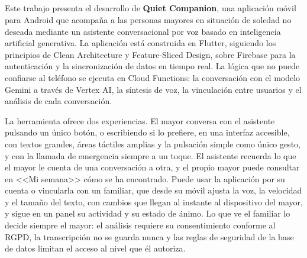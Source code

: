 \pagestyle{empty}

\chapter*{}

\thispagestyle{empty}

\begin{center}
{\large\bfseries \thetitle}\\
\end{center}
\begin{center}
\theauthor\\
\end{center}

\vspace{0.5cm}
\par\vspace{\baselineskip}

Este trabajo presenta el desarrollo de \textbf{Quiet Companion}, una aplicación móvil para Android que acompaña a las personas mayores en situación de soledad no deseada mediante un asistente conversacional por voz basado en inteligencia artificial generativa. La aplicación está construida en Flutter, siguiendo los principios de Clean Architecture y Feature-Sliced Design, sobre Firebase para la autenticación y la sincronización de datos en tiempo real. La lógica que no puede confiarse al teléfono se ejecuta en Cloud Functions: la conversación con el modelo Gemini a través de Vertex AI, la síntesis de voz, la vinculación entre usuarios y el análisis de cada conversación.

La herramienta ofrece dos experiencias. El mayor conversa con el asistente pulsando un único botón, o escribiendo si lo prefiere, en una interfaz accesible, con textos grandes, áreas táctiles amplias y la pulsación simple como único gesto, y con la llamada de emergencia siempre a un toque. El asistente recuerda lo que el mayor le cuenta de una conversación a otra, y el propio mayor puede consultar en <<Mi semana>> cómo se ha encontrado. Puede usar la aplicación por su cuenta o vincularla con un familiar, que desde su móvil ajusta la voz, la velocidad y el tamaño del texto, con cambios que llegan al instante al dispositivo del mayor, y sigue en un panel su actividad y su estado de ánimo. Lo que ve el familiar lo decide siempre el mayor: el análisis requiere su consentimiento conforme al RGPD, la transcripción no se guarda nunca y las reglas de seguridad de la base de datos limitan el acceso al nivel que él autoriza.

